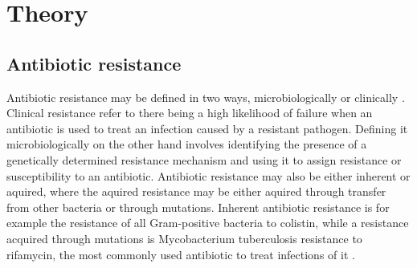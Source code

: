 \chapter{Theory}


% 

\section{Antibiotic resistance}
Antibiotic resistance may be defined in two ways, microbiologically or clinically \cite{macgowan2017AntibioticResistance}.
Clinical resistance refer to there being a high likelihood of failure when an antibiotic is used to treat an infection caused by a resistant pathogen. 
Defining it microbiologically on the other hand involves identifying the presence of a genetically determined resistance mechanism and using it to assign resistance or susceptibility to an antibiotic.
Antibiotic resistance may also be either inherent or aquired, where the aquired resistance may be either aquired through transfer from other bacteria or through mutations. 
Inherent antibiotic resistance is for example the resistance of all Gram-positive bacteria to colistin, while a resistance acquired through mutations is Mycobacterium tuberculosis resistance to rifamycin, the most commonly used antibiotic to treat infections of it \cite{molodtsov2017StructuralBasisRifamycin}. 

